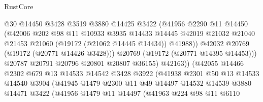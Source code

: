 \begin{lexlean}{RustCore}
\begin{coremodule}
                              @30
                              @14450
                              @3428
                              @3519
                              @3880
                              @14425
                              @3422
                              (@41956
                                @2290
                                @11
                                @14450
                                (@42006
                                  @202
                                  @98
                                  @11
                                  @10933
                                  @3935
                                  @14433
                                  @14445
                                  @42019
                                  @21032
                                  @21040
                                  @21453
                                  @21060
                                  (@19172 (@21062 @14445 @14434))
                                  @41988))
                              @42032
                              @20769
                              (@19172 (@20771 @14426 @3428)))
                            @20769
                            (@19172 (@20771 @14395 @14453)))
                          @20787
                          @20791
                          @20796
                          @20801
                          @20807
                          @36155)
                        @42163))
                    (@42055
                      @14466
                      @2302
                      @679
                      @13
                      @14533
                      @14542
                      @3428
                      @3922
                      (@41938
                        @2301
                        @50
                        @13
                        @14533
                        @14540
                        @3904
                        (@41945
                          @1479
                          @2300
                          @11
                          @49
                          @14497
                          @14532
                          @14539
                          @3880
                          @14471
                          @3422
                          (@41956
                            @1479
                            @11
                            @14497
                            (@41963
                              @224
                              @98
                              @11
                              @6110

\end{coremodule}
\end{lexlean}

